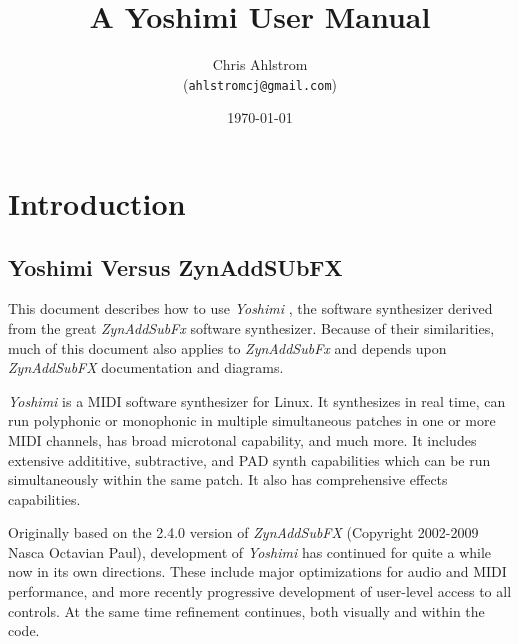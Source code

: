 \documentclass[
 11pt,
 twoside,
 a4paper,
 headinclude,
 footinclude,
 final                                 %
]{article}
\begin{document}
\title{A Yoshimi User Manual}
\author{Chris Ahlstrom\\
   (\texttt{ahlstromcj@gmail.com})}
\date{\today}
\maketitle
\tableofcontents
\listoffigures                         %
\listoftables                          %


\setlength{\parindent}{0pt}
\setlength{\parskip}{1ex plus 0.5ex minus 0.2ex}

\section{Introduction}
\label{sec:introduction}

\subsection{Yoshimi Versus ZynAddSUbFX}
\label{subsec:introduction_yoshimi_vs_zyn}

   This document describes how to use \textsl{Yoshimi} \cite{yoshimi},
   the software synthesizer derived from the great
   \textsl{ZynAddSubFx} \cite{zynaddsubfx} software
   synthesizer.  Because of their similarities, much of this document also
   applies to \textsl{ZynAddSubFx} and depends upon \textsl{ZynAddSubFX}
   documentation and diagrams.

   \textsl{Yoshimi} is a MIDI software synthesizer for Linux. It synthesizes
   in real time, can run polyphonic or monophonic in multiple
   simultaneous patches in one or more MIDI channels, has broad microtonal
   capability, and much more. It includes extensive addititive, subtractive,
   and PAD synth capabilities which can be run simultaneously within the
   same patch.  It also has comprehensive effects capabilities.

   Originally based on the 2.4.0 version of \textsl{ZynAddSubFX} (Copyright
   2002-2009 Nasca Octavian Paul), development of \textsl{Yoshimi} has
   continued for quite a while now in its own directions. These include
   major optimizations for audio and MIDI performance, and more recently
   progressive development of user-level access to all controls. At the same
   time refinement continues, both visually and within the code.
\end{document}
